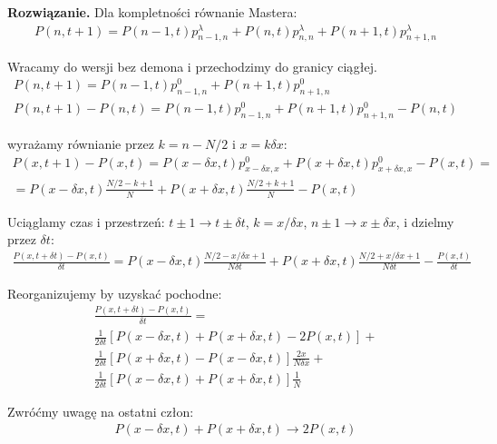 \documentclass[11pt,a4paper]{article}
\newenvironment{solution}{\vspace{1cm} \par\textbf{Rozwiązanie.} \vspace{1cm}}{}
\begin{document}
\begin{solution}
Dla kompletności równanie Mastera:
\begin{align*}
  P(n, t+1) = P(n-1, t)p^{\lambda}_{n-1,n} + P(n,t)p^{\lambda}_{n,n} + P(n+1, t)p^{\lambda}_{n+1,n}
\end{align*}


\vspace{2cm}

Wracamy do wersji bez demona i przechodzimy do granicy ciągłej.
\begin{align*}
  P(n, t+1) = P(n-1, t)p^0_{n-1,n} + P(n+1, t)p^0_{n+1,n} \\
  P(n, t+1) - P(n,t) = P(n-1, t)p^0_{n-1,n} + P(n+1, t)p^0_{n+1,n} - P(n,t)
\end{align*}

wyrażamy równianie przez $k = n - N/2$ i $x = k \delta x$:
\begin{align*}
  P(x, t+1) - P(x,t) = P(x-\delta x, t)p^0_{x-\delta x,x} + P(x+\delta x, t)p^0_{x+\delta x,x} - P(x,t) = \\
  = P(x-\delta x, t) \frac{N/2 - k + 1}{N} + P(x+\delta x, t) \frac{N/2 + k + 1}{N} - P(x, t)
\end{align*}

Uciąglamy czas i przestrzeń: 
$t \pm 1 \to t \pm \delta t$, $k =  x/ \delta x$, $n \pm 1 \to x \pm \delta x$,
 i dzielmy przez $\delta t$:
\begin{align*}
  \frac{P(x, t+\delta t) - P(x,t)}{\delta t} = 
  P(x-\delta x, t) \frac{N/2 - x/\delta x + 1}{N\delta t} + 
  P(x+\delta x, t) \frac{N/2 + x/\delta x + 1}{N\delta t} - \frac{P(x,t)}{\delta t}
\end{align*}

Reorganizujemy by uzyskać pochodne:
\begin{align*}
  \frac{P(x, t+\delta t) - P(x,t)}{\delta t} = \\
  \frac{1}{2\delta t} \left[ P(x-\delta x, t) + P(x+\delta x, t) - 2P(x,t) \right] + \\ 
  \frac{1}{2\delta t} \left[ P(x+\delta x, t) - P(x-\delta x, t) \right] \frac{2x}{N\delta x} + \\
  \frac{1}{2\delta t} \left[ P(x-\delta x, t) + P(x+\delta x, t) \right] \frac{1}{N}
\end{align*}

Zwróćmy uwagę na ostatni człon:
\begin{align*}
   P(x-\delta x, t) + P(x+\delta x, t) \to 2P(x,t)
\end{align*}



\end{solution}
\end{document}
